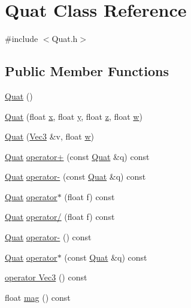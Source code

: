 \hypertarget{class_quat}{}\section{Quat Class Reference}
\label{class_quat}


{\ttfamily \#include $<$Quat.\+h$>$}

\subsection*{Public Member Functions}
\begin{DoxyCompactItemize}
\item 
\hyperlink{class_quat_afe432f2aac598c876a51b16dce29aa13}{Quat} ()
\item 
\hyperlink{class_quat_aee6d96df262aa9a4057687150487335f}{Quat} (float \hyperlink{class_quat_a15db053bd6750a53e33bf30a0250c288}{x}, float \hyperlink{class_quat_ac6045ee4149a978a4ce429c132e46fa2}{y}, float \hyperlink{class_quat_a611fbb79f7b802da4f1c65a31c2c5fea}{z}, float \hyperlink{class_quat_ad3aeee2134443ec0897793834209b0c0}{w})
\item 
\hyperlink{class_quat_a49ba2fef4f78fd0613ce88f15a8c07dd}{Quat} (\hyperlink{class_vec3}{Vec3} \&v, float \hyperlink{class_quat_ad3aeee2134443ec0897793834209b0c0}{w})
\item 
\hyperlink{class_quat}{Quat} \hyperlink{class_quat_aec3d34271a6ef9115d2f602a6ad39d51}{operator+} (const \hyperlink{class_quat}{Quat} \&q) const 
\item 
\hyperlink{class_quat}{Quat} \hyperlink{class_quat_a6a20e98cde2614f041c4c07bba6f7bdc}{operator-\/} (const \hyperlink{class_quat}{Quat} \&q) const 
\item 
\hyperlink{class_quat}{Quat} \hyperlink{class_quat_aca15ff29d3ebcb45d40c372314ba9591}{operator$\ast$} (float f) const 
\item 
\hyperlink{class_quat}{Quat} \hyperlink{class_quat_aaf77676a143317a00100ff0f681c3742}{operator/} (float f) const 
\item 
\hyperlink{class_quat}{Quat} \hyperlink{class_quat_a01739a8b02cd7279dfe83a836bf058ec}{operator-\/} () const 
\item 
\hyperlink{class_quat}{Quat} \hyperlink{class_quat_ab33e8eac27cf8dd39a4fc036330d730d}{operator$\ast$} (const \hyperlink{class_quat}{Quat} \&q) const 
\item 
\hyperlink{class_quat_aac427de1dec0faaa871bced8d196f159}{operator Vec3} () const 
\item 
float \hyperlink{class_quat_a8ba32b8f84e048bab4b58618303b2ce5}{mag} () const 

\end{DoxyCompactItemize}
